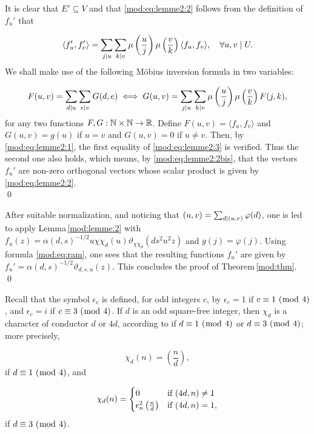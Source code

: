 \documentclass[leqno,10pt]{amsart}
\theoremstyle{plain}
\numberwithin{equation}{section}
\theoremstyle{definition}
\theoremstyle{remark}
\begin{document}
\proof
It is clear that $E'\subseteq V$ and that \eqref{mod:eq:lemme2:2} follows from the definition of $f_u'$ that

\begin{equation}\label{mod:eq:lemme2:2bis}
\langle f_u',f_v'\rangle =\sum_{j\vert u}\sum_{k\vert v}\mu\left(\frac{u}{j}\right) \mu\left(\frac{v}{k}\right) \langle f_u,f_v\rangle, \quad \forall u,v \mid U.
\end{equation} 
We shall make use of the following M\"obius inversion formula in two variables: 

\begin{equation}\label{mod:eq:lemme2:3}
F(u,v)=\sum_{d\vert u} \sum_{e\vert v} G(d,e) \iff G(u,v)=\sum_{j\vert u}\sum_{k\mid v} \mu\left(\frac{u}{j}\right) \mu\left(\frac{v}{k}\right) F(j,k),
\end{equation}
for any two functions $F,G:\mathbb{N}\times\mathbb{N}\to \mathbb{R}$. Define $F(u,v)=\langle f_u,f_v\rangle$ and $G(u,v)=g(u)$ if $u=v$ and $G(u,v)=0$ if $u\neq v$. Then, by \eqref{mod:eq:lemme2:1}, the first equality of \eqref{mod:eq:lemme2:3} is verified. Thus the second one also holds, which means, by \eqref{mod:eq:lemme2:2bis}, that the vectors $f_u'$ are non-zero orthogonal vectors whose scalar product is given by \eqref{mod:eq:lemme2:2}.\\
\qed

After suitable normalization, and noticing that $(u,v)=\sum_{d\vert (u,v)}\varphi(d)$, one is led to apply Lemma\,\ref{mod:lemme:2} with $f_u(z)= \alpha(d,s)^{-1/2} u \chi\chi_d(u) \vartheta_{\chi\chi_d}(ds^2u^2z)$ and $g(j)=\varphi(j)$. Using formula \eqref{mod:eq:ram}, one sees that the resulting functions $f_u'$ are given by $f_u'=\alpha(d,s)^{-1/2} \vartheta_{d,s,u}(z)$. This concludes the proof of Theorem\,\ref{mod:thm}.\\ 
\qed

Recall that the symbol $\epsilon_c$ is defined, for odd integers $c$, by $\epsilon_c=1$ if $c\equiv 1 \ (\bmod\  4)$, and $\epsilon_c=i$ if $c\equiv 3 \ (\bmod\  4)$. If $d$ is an odd square-free integer, then $\chi_d$ is a character of conductor $d$ or $4d$, according to if $d\equiv 1 \ (\bmod\  4)$ or $d\equiv 3 \ (\bmod\  4)$; more precisely,

\begin{equation*}
\chi_d(n)=\left(\frac{n}{d}\right),
\end{equation*}
if $d\equiv 1 \ (\bmod\  4)$, and 

\begin{equation*}
\chi_d(n)=\begin{cases}
0&\textnormal{if }(4d,n)\neq 1\\
\epsilon_n^2 \left(\frac{n}{d}\right)&\textnormal{if }(4d,n)= 1,
\end{cases}
\end{equation*}
if $d\equiv 3 \ (\bmod\  4)$. 
\end{document}
